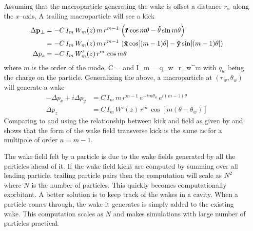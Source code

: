 Assuming that the macroparticle generating the wake is offset a
distance $r_w$ along the $x$--axis, A trailing macroparticle will see a kick
\begin{align}
  \Delta {{\bf p}}_\perp &= 
    -C \, I_m \, W_m(z) \, m \, r^{m-1} \, \left( 
    {\bf\hat r} \cos m\theta - {\bf\hat\theta} \sin m\theta \right) \\
  &= -C \, I_m \, W_m(z) \, m \, r^{m-1} \, \left( 
    {\bf\hat x} \cos [(m-1) \theta] - 
    {\bf\hat y} \sin [(m-1)\theta] \right) \nonumber \\
  \Delta p_z &= -C \, I_m \, W'_m(z) \, r^m \, \cos m\theta
\end{align}
where $m$ is the order of the mode,
\Begineq
  C = 
\Endeq
 and
\Begineq
  I_m = q_w \, r_w^m
\Endeq
with $q_w$ being the charge on the particle. Generalizing the above, a
macroparticle at $(r_w, \theta_w)$ will generate a wake
\begin{align}
  -\Delta p_x + i\Delta p_y &= C \, I_m \, 
    m \, r^{m-1} \, e^{-i m \theta_w} \, e^{i (m-1) \theta} 
    \label{ppcimr} \\
  \Delta p_z &= C \, I_m \, W'(z) \, r^m \, \cos [m(\theta - \theta_w)]
    \label{pciwr}
\end{align}
Comparing  to  and using the relationship between
kick and field as given by  and  shows that
the form of the wake field transverse kick is the same as for a
multipole of order $n = m - 1$. 

The wake field felt by a particle is due to the wake fields generated by
all the particles ahead of it. If the wake field kicks are computed by
summing over all leading particle, trailing particle pairs then the
computation will scale as $N^2$ where $N$ is the number of
particles. This quickly becomes computationally exorbitant. A better
solution is to keep track of the wakes in a cavity. When a particle
comes through, the wake it generates is simply added to the existing
wake. This computation scales as $N$ and makes simulations with large
number of particles practical. 

